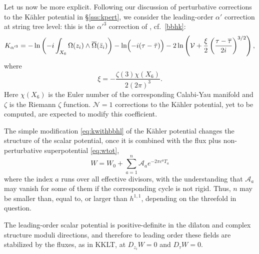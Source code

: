\documentclass[12pt,a4wide]{article}
\def\V{\mathcal{V}}
\def\be{\begin{equation}}
\def\ee{\end{equation}}
\begin{document}
Let us now be more explicit.  Following our discussion of perturbative corrections to the K\"ahler potential in \S\ref{sss:kpert}, we consider the leading-order $\alpha'$ correction at string tree level: this is the $\alpha'^3$ correction of \cite{Becker:2002nn}, cf.~\eqref{bbhk}:
\be\label{eq:kwithbbhl}
K_{\alpha'^3}=-\ln\left(-{i}\int_{X_6}\Omega(z_i)\wedge\overline{\Omega}({\bar z}_i )\right)-\ln\Bigl(-i(\tau-\bar\tau)\Bigr)-2\ln\left(\V+\frac{\xi}{2}\left(\frac{\tau-\overline\tau}{2i}\right)^{3/2}\right),  
\ee
where 
\be
\xi =-\frac{\zeta(3)\chi(X_6)}{2(2\pi)^3}.
\ee
Here $\chi(X_6)$ is the Euler number of the corresponding Calabi-Yau manifold and $\zeta$ is the Riemann $\zeta$ function. $\mathcal{N}=1$ corrections to the K\"ahler potential, yet to be computed, are expected to modify this coefficient.

The simple modification \eqref{eq:kwithbbhl} of the K\"ahler potential changes the structure of the scalar potential, once it is combined with the flux plus non-perturbative superpotential \eqref{eq:wtot},
\be\label{eq:wlvs}
W=W_0+\sum_{a=1}^n \mathcal{A}_a e^{-2\pi c^a T_a}
\ee
where the index $a$ runs over all effective divisors,
with the understanding that $\mathcal{A}_a$ may vanish for some of them if the corresponding cycle is not rigid.  Thus, $n$ may be smaller than, equal to, or larger than $h^{1,1}$, depending on the threefold in question.  
 
The leading-order scalar potential is positive-definite in the dilaton and complex structure moduli directions, and therefore to leading order these fields are stabilized by the fluxes, as in KKLT, at $D_{z_i}W=0$ and $D_\tau W=0$.
 
\end{document}
